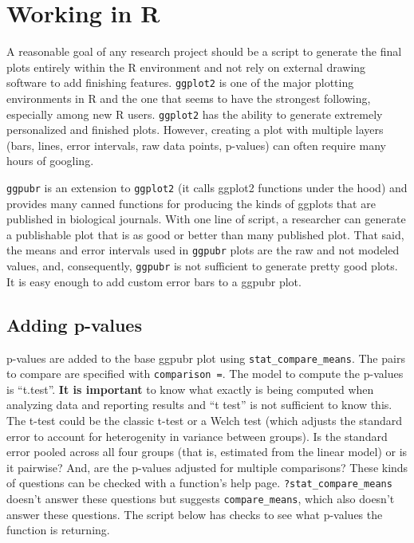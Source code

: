 \documentclass[]{book}
\begin{document}
\section{Working in R}\label{working-in-r}

A reasonable goal of any research project should be a script to generate
the final plots entirely within the R environment and not rely on
external drawing software to add finishing features. \texttt{ggplot2} is
one of the major plotting environments in R and the one that seems to
have the strongest following, especially among new R users.
\texttt{ggplot2} has the ability to generate extremely personalized and
finished plots. However, creating a plot with multiple layers (bars,
lines, error intervals, raw data points, p-values) can often require
many hours of googling.

\texttt{ggpubr} is an extension to \texttt{ggplot2} (it calls ggplot2
functions under the hood) and provides many canned functions for
producing the kinds of ggplots that are published in biological
journals. With one line of script, a researcher can generate a
publishable plot that is as good or better than many published plot.
That said, the means and error intervals used in \texttt{ggpubr} plots
are the raw and not modeled values, and, consequently, \texttt{ggpubr}
is not sufficient to generate pretty good plots. It is easy enough to
add custom error bars to a ggpubr plot.

\subsection{Adding p-values}\label{adding-p-values}

p-values are added to the base ggpubr plot using
\texttt{stat\_compare\_means}. The pairs to compare are specified with
\texttt{comparison\ =}. The model to compute the p-values is ``t.test''.
\textbf{It is important} to know what exactly is being computed when
analyzing data and reporting results and ``t test'' is not sufficient to
know this. The t-test could be the classic t-test or a Welch test (which
adjusts the standard error to account for heterogenity in variance
between groups). Is the standard error pooled across all four groups
(that is, estimated from the linear model) or is it pairwise? And, are
the p-values adjusted for multiple comparisons? These kinds of questions
can be checked with a function's help page.
\texttt{?stat\_compare\_means} doesn't answer these questions but
suggests \texttt{compare\_means}, which also doesn't answer these
questions. The script below has checks to see what p-values the function
is returning.
\end{document}
